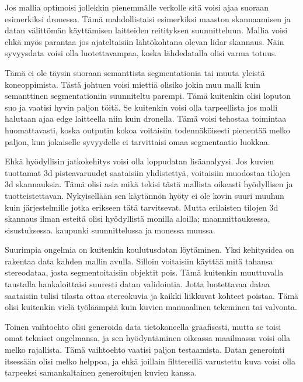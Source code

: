 Jos mallia optimoisi jollekkin pienemmälle verkolle sitä voisi ajaa suoraan esimerkiksi dronessa. Tämä mahdollistaisi esimerkiksi maaston skannaamisen ja datan välittömän käyttämisen laitteiden reitityksen suunnitteluun. Mallia voisi ehkä myös parantaa jos ajateltaisiin lähtökohtana olevan lidar skannaus. Näin syvyysdata voisi olla luotettavampaa, koska lähdedatalla olisi varma totuus. 

Tämä ei ole täysin suoraan semanttista segmentationia tai muuta yleistä koneoppimista.
Tästä johtuen voisi miettiä olisiko jokin muu malli kuin semanttinen segmentationiin suunniteltu parempi. Tämä kuitenkin olisi loputon suo ja vaatisi hyvin paljon töitä. Se kuitenkin voisi olla tarpeellista jos malli halutaan ajaa edge laitteella niin kuin dronella. 
Tämä voisi tehostaa toimintaa huomattavasti, koska outputin kokoa voitaisiin todennäköisesti pienentää melko paljon, kun jokaiselle syvyydelle ei tarvittaisi omaa segmentaatio luokkaa.

Ehkä hyödyllisin jatkokehitys voisi olla loppudatan lisäanalyysi. Jos kuvien tuottamat 3d pisteavaruudet saataisiin yhdistettyä, voitaisiin muodostaa tilojen 3d skannauksia.
Tämä olisi asia mikä tekisi tästä mallista oikeasti hyödyllisen ja tuotteistettavan. Nykyisellään sen käytännön hyöty ei ole kovin suuri muuhun kuin järjestelmille jotka erikseen tätä tarvitsevat. Mutta erilaisten tilojen 3d skannaus ilman esteitä olisi hyödyllistä monilla aloilla; maanmittauksessa, sisustuksessa. kaupunki suunnittelussa ja monessa muussa.

Suurimpia ongelmia on kuitenkin koulutusdatan löytäminen.
Yksi kehitysidea on rakentaa data kahden mallin avulla.
Silloin voitaisiin käyttää mitä tahansa stereodataa, josta segmentoitaisiin objektit pois.
Tämä kuitenkin muuttuvalla taustalla hankaloittaisi suuresti datan validointia.
Jotta luotettavaa dataa saataisiin tulisi tilasta ottaa stereokuvia ja kaikki liikkuvat kohteet poistaa.
Tämä olisi kuitenkin vielä työläämpää kuin kuvien manuaalinen tekeminen tai valvonta.

Toinen vaihtoehto olisi generoida data tietokoneella graafisesti, mutta se toisi omat tekniset ongelmansa, ja sen hyödyntäminen oikeassa maailmassa voisi olla melko rajallista.
Tämä vaihtoehto vaatisi paljon testaamista.
Datan generointi itsessään olisi melko helppoa, ja ehkä joillain filttereillä varustettu kuva voisi olla tarpeeksi samankaltainen generoitujen kuvien kanssa.
